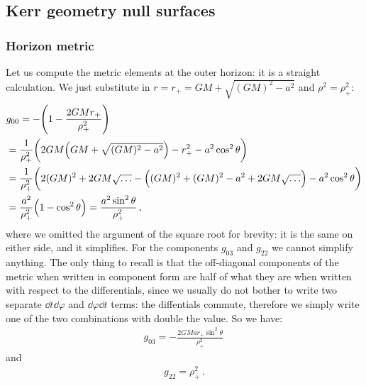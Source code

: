 \documentclass[main.tex]{subfiles}
\begin{document}
\subsection{Kerr geometry null surfaces}

\subsubsection{Horizon metric}

Let us compute the metric elements at the outer horizon: it is a straight calculation. We just substitute in \(r = r_{+} = GM + \sqrt{(GM)^2 - a^2}\) and \(\rho^2 = \rho^2_{+}\): 
%
\begin{subequations}
\begin{align}
  &g_{00}  = - \qty(1 - \frac{2GMr_{+}}{\rho_{+}^2})  \\
  &= \frac{1}{\rho_{+}^2} \qty(2GM \qty(GM + \sqrt{(GM)^2 - a^2}) - r_{+}^2 - a^2 \cos^2\theta )  \\
  &= \frac{1}{\rho_{+}^2} \qty( 2 (GM)^2 + 2GM \sqrt{\dots}- \qty((GM)^2 + (GM)^2 -a^2 + 2GM \sqrt{\dots}) - a^2 \cos^2 \theta )  \\
  &= \frac{a^2}{\rho_{+}^2}  \qty(1 - \cos^2 \theta ) = \frac{a^2 \sin^2\theta}{\rho_{+}^2}
\,,
\end{align}
\end{subequations}
%
where we omitted the argument of the square root for brevity: it is the same on either side, and it simplifies. 
For the components \(g_{03}\) and \(g_{22} \) we cannot simplify anything. The  only thing to recall is that the off-diagonal components of the metric when written in component form are half of what they are when written with respect to the differentials, since we usually do not bother to write two separate \(\dd{t} \dd{\varphi }\) and \(\dd{\varphi } \dd{t}\) terms: the diffentials commute, therefore we simply write one of the two combinations with double the value. So we have: 
%
\begin{align}
  g_{03} = -\frac{2GMa r_+ \sin^2\theta }{\rho_{+}^2}
\,
\end{align}
and 
%
\begin{align}
  g_{22} = \rho_{+}^2
\,.
\end{align}
\end{document}
